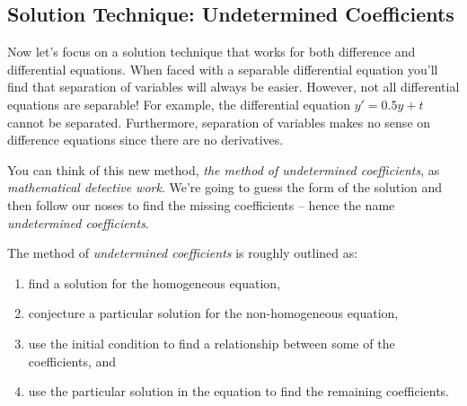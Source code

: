 \subsection{Solution Technique: Undetermined Coefficients}
Now let's focus on a solution technique that works for both difference and differential
equations.  When faced with a separable differential equation you'll find that separation
of variables will always be easier.  However, not all differential equations are
separable!  For example, the differential equation $y' = 0.5y + t$ cannot be separated.
Furthermore, separation of variables makes no sense on difference equations since there
are no derivatives.

You can think of this new method, {\it the method of undetermined coefficients}, as {\it
mathematical detective work}.  We're going to guess the form of the solution and then
follow our noses to find the missing coefficients -- hence the name {\it undetermined
coefficients}.  

\begin{technique}
    The method of {\it undetermined coefficients} is roughly outlined as:
    \begin{enumerate}
        \item find a solution for the homogeneous equation,
        \item conjecture a particular solution for the non-homogeneous equation, 
        \item use the initial condition to find a relationship between some of the
            coefficients, and
        \item use the particular solution in the equation to find the
            remaining coefficients.
    \end{enumerate}
\end{technique}

